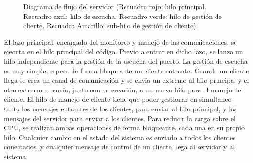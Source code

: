 \documentclass[12pt,letterpaper]{article}     %
\begin{document}
\begin{figure}[!h]
\begin{center}
		\end{center}
	\caption{Diagrama de flujo del servidor (Recuadro rojo: hilo principal. 
	Recuadro azul: hilo de escucha. 
	Recuadro verde: hilo de gestión de cliente. 
	Recuadro Amarillo: sub-hilo de gestión de cliente)}
	\label{fig:diagramaServer}
	\end{figure}

	El lazo principal, encargado del monitoreo y manejo de las comunicaciones, se ejecuta en el hilo principal del código. 
	Previo a entrar en dicho lazo, se lanza un hilo independiente para la gestión de la escucha del puerto.
	La gestión de escucha es muy simple, espera de forma bloqueante un cliente entrante. Cuando un cliente llega
	se crea un canal de comunicación y se envía un extremo al hilo principal y el otro extremo se envía, junto con su
	creación, a un nuevo hilo para el manejo del cliente.
	El hilo de manejo de cliente tiene que poder gestionar en simultaneo tanto los mensajes entrantes de los clientes,
	para enviar al hilo principal, y los mensajes del servidor para enviar a los clientes. Para reducir la carga 
	sobre el CPU, se realizan ambas operaciones de forma bloqueante, cada una en su propio hilo. 
	Cualquier cambio en el estado del sistema es enviado a todos los clientes conectados, y cualquier mensaje de
	control de un cliente llega al servidor y al sistema.
\end{document}
